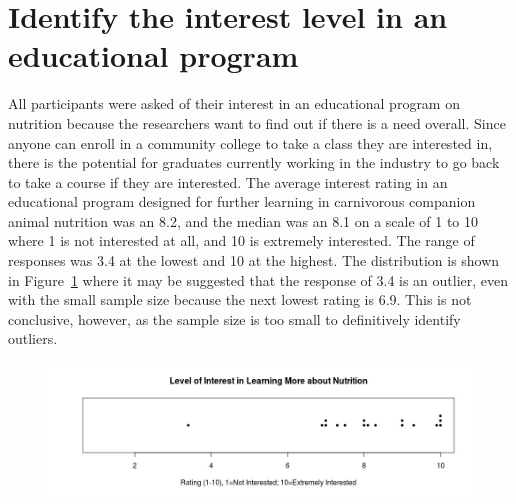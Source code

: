 \section{Identify the interest level in an educational program}
All participants were asked of their interest in an educational program on nutrition because the researchers want to find out if there is a need overall. Since anyone can enroll in a community college to take a class they are interested in, there is the potential for graduates currently working in the industry to go back to take a course if they are interested. The average interest rating in an educational program designed for further learning in carnivorous companion animal nutrition was an 8.2, and the median was an 8.1 on a scale of 1 to 10 where 1 is not interested at all, and 10 is extremely interested. The range of responses was 3.4 at the lowest and 10 at the highest. The distribution is shown in Figure~\ref{mgraph6} where it may be suggested that the response of 3.4 is an outlier, even with the small sample size because the next lowest rating is 6.9. This is not conclusive, however, as the sample size is too small to definitively identify outliers.
    \begin{figure}[htbp] 
    \centering
    \textbf{}\par\medskip
    \includegraphics[width=1.0\textwidth]{Images/loiilman.jpeg}
    \label{mgraph6}
    \end{figure}
